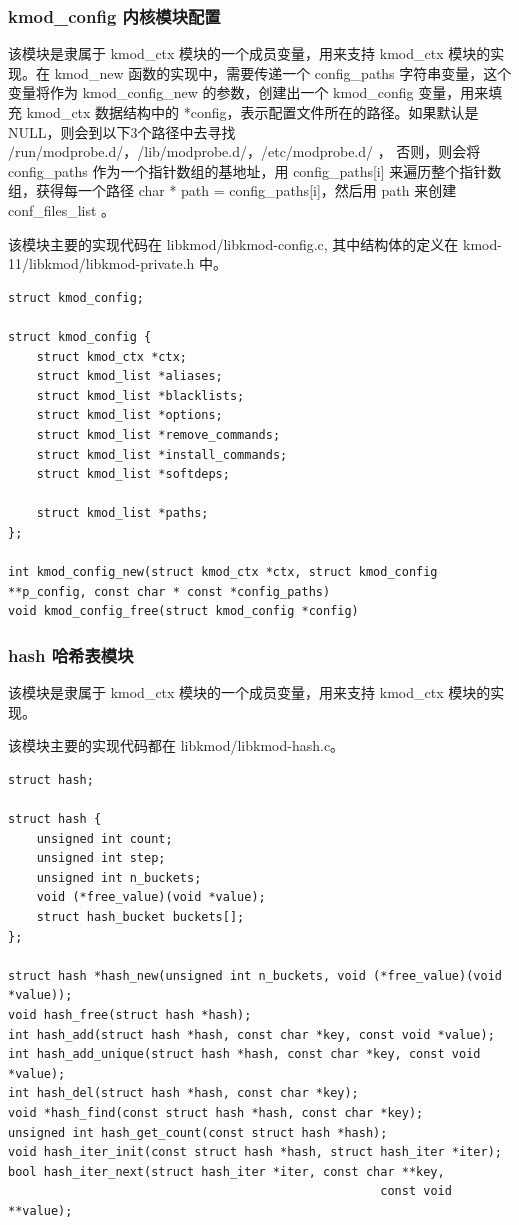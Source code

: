 \documentclass[11pt,a4paper]{article}
\begin{document}
\subsubsection{kmod\_config 内核模块配置}

该模块是隶属于 kmod\_ctx 模块的一个成员变量，用来支持 kmod\_ctx
模块的实现。在 kmod\_new 函数的实现中，需要传递一个 config\_paths
字符串变量，这个变量将作为 kmod\_config\_new 的参数，创建出一个
kmod\_config 变量，用来填充 kmod\_ctx 数据结构中的
*config，表示配置文件所在的路径。如果默认是NULL，则会到以下3个路径中去寻找
/run/modprobe.d/，/lib/modprobe.d/，/etc/modprobe.d/ ， 否则，则会将
config\_paths 作为一个指针数组的基地址，用 config\_paths{[}i{]}
来遍历整个指针数组，获得每一个路径 char * path =
config\_paths{[}i{]}，然后用 path 来创建 conf\_files\_list 。

该模块主要的实现代码在 libkmod/libkmod-config.c, 其中结构体的定义在
kmod-11/libkmod/libkmod-private.h 中。

{\begin{shaded}\begin{verbatim}
struct kmod_config;

struct kmod_config {
    struct kmod_ctx *ctx;
    struct kmod_list *aliases;
    struct kmod_list *blacklists;
    struct kmod_list *options;
    struct kmod_list *remove_commands;
    struct kmod_list *install_commands;
    struct kmod_list *softdeps;

    struct kmod_list *paths;
};

int kmod_config_new(struct kmod_ctx *ctx, struct kmod_config **p_config, const char * const *config_paths)
void kmod_config_free(struct kmod_config *config)
\end{verbatim}\end{shaded}}
\subsubsection{hash 哈希表模块}

该模块是隶属于 kmod\_ctx 模块的一个成员变量，用来支持 kmod\_ctx
模块的实现。

该模块主要的实现代码都在 libkmod/libkmod-hash.c。

{\begin{shaded}\begin{verbatim}
struct hash;

struct hash {
    unsigned int count;
    unsigned int step;
    unsigned int n_buckets;
    void (*free_value)(void *value);
    struct hash_bucket buckets[];
};

struct hash *hash_new(unsigned int n_buckets, void (*free_value)(void *value));
void hash_free(struct hash *hash);
int hash_add(struct hash *hash, const char *key, const void *value);
int hash_add_unique(struct hash *hash, const char *key, const void *value);
int hash_del(struct hash *hash, const char *key);
void *hash_find(const struct hash *hash, const char *key);
unsigned int hash_get_count(const struct hash *hash);
void hash_iter_init(const struct hash *hash, struct hash_iter *iter);
bool hash_iter_next(struct hash_iter *iter, const char **key,
                                                    const void **value);
\end{verbatim}\end{shaded}}
\end{document}
